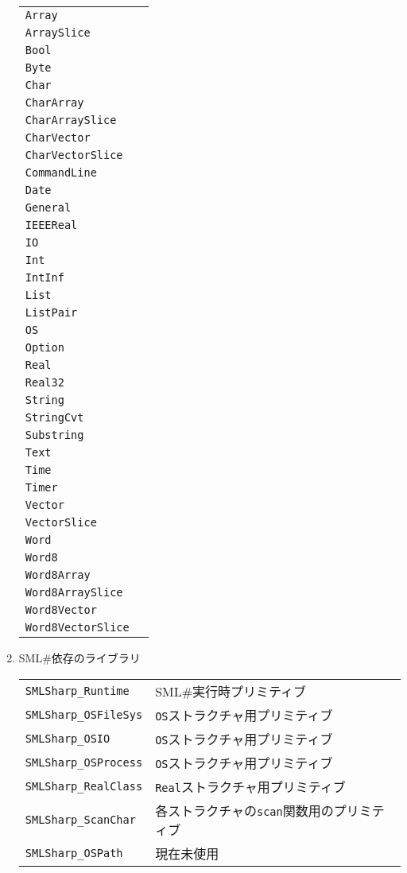 \documentclass{jbook}
\newcommand{\smlsharp}{SML\#}
\newcommand{\code}[1]{\mbox{\large\tt #1}}
\begin{document}
\begin{enumerate}
\begin{tabular}{ll}
\code{Array}& \\
\code{ArraySlice}& \\
\code{Bool}& \\
\code{Byte}& \\
\code{Char}& \\
\code{CharArray}& \\
\code{CharArraySlice}& \\
\code{CharVector}& \\
\code{CharVectorSlice}& \\
\code{CommandLine}& \\
\code{Date}& \\
\code{General}& \\
\code{IEEEReal}& \\
\code{IO}& \\
\code{Int}& \\
\code{IntInf}& \\
\code{List}& \\
\code{ListPair}& \\
\code{OS}& \\
\code{Option}& \\
\code{Real}& \\
\code{Real32}& \\
\code{String}& \\
\code{StringCvt}& \\
\code{Substring}& \\
\code{Text}& \\
\code{Time}& \\
\code{Timer}& \\
\code{Vector}& \\
\code{VectorSlice}& \\
\code{Word}& \\
\code{Word8}& \\
\code{Word8Array}& \\
\code{Word8ArraySlice}& \\
\code{Word8Vector}& \\
\code{Word8VectorSlice} & \\
\end{tabular}

\item \smlsharp{}依存のライブラリ

\begin{tabular}{ll}
\code{SMLSharp\_Runtime} & \smlsharp{}実行時プリミティブ
\\
\code{SMLSharp\_OSFileSys} & \code{OS}ストラクチャ用プリミティブ
\\
\code{SMLSharp\_OSIO} & \code{OS}ストラクチャ用プリミティブ
\\
\code{SMLSharp\_OSProcess} & \code{OS}ストラクチャ用プリミティブ
\\
\code{SMLSharp\_RealClass} & \code{Real}ストラクチャ用プリミティブ
\\
\code{SMLSharp\_ScanChar}  & 各ストラクチャの\code{scan}関数用のプリミティブ
\\
\code{SMLSharp\_OSPath} & 現在未使用
\end{tabular}


\end{enumerate}
\end{document}
